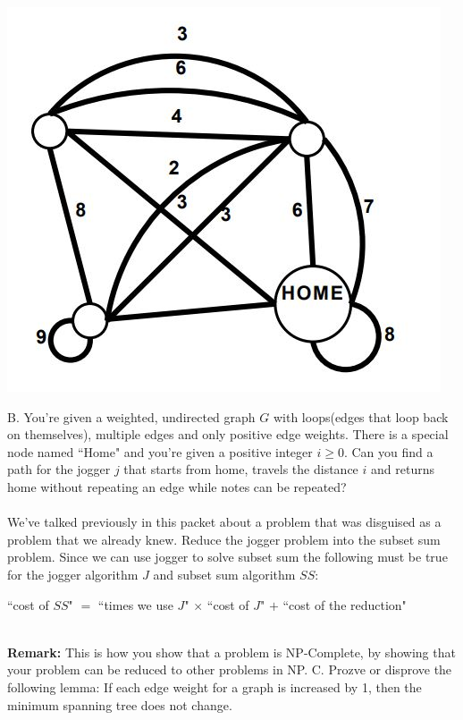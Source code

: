 \documentclass[12pt]{article}
\begin{document}
\centerline{\includegraphics[scale = .45]{jogger.jpg}}
\noindent B. You're given a weighted, undirected graph $G$ with loops(edges that loop back on themselves), 
 multiple edges and only positive edge weights. There is a special node named ``Home" and you're given a positive integer $i \geq 0$.
 Can you find a path for the jogger $j$ that starts from home, travels the distance $i$ and returns home without repeating an edge while notes can be repeated?
\\\\We've talked previously in this packet about a problem that was disguised as a problem that we already knew. Reduce the jogger problem into the subset sum problem. 
 Since we can use jogger to solve subset sum the following must be true for the jogger algorithm $J$ and subset sum algorithm $SS$: \\
 \centerline{``cost of $SS$" $=$ ``times we use $J$" $\times$ ``cost of $J$" $+$ ``cost of the reduction"} \\
 \textbf{Remark:} This is how you show that a problem is NP-Complete, by showing that 
 your problem can be reduced to other problems in NP.
\newpage 
\noindent C. Prozve or disprove the following lemma: If each edge weight for a graph is increased by 1, then the minimum spanning tree does not change.\\\\\\\\\\\\\\\\\\\\\\\\\\\\\\\\\\\\
\end{document}
